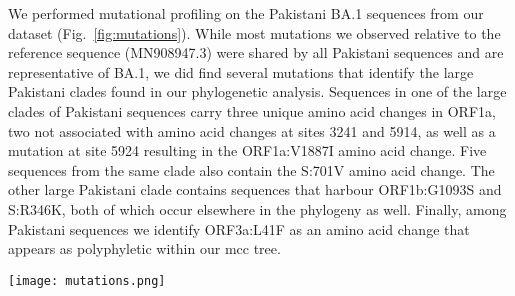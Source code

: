 We performed mutational profiling on the Pakistani BA.1 sequences from our dataset (Fig.~\ref{fig:mutations}).
While most mutations we observed relative to the reference sequence (MN908947.3) were shared by all Pakistani sequences and are representative of BA.1, we did find several mutations that identify the large Pakistani clades found in our phylogenetic analysis.
Sequences in one of the large clades of Pakistani sequences carry three unique amino acid changes in ORF1a, two not associated with amino acid changes at sites 3241 and 5914, as well as a mutation at site 5924 resulting in the ORF1a:V1887I amino acid change.
Five sequences from the same clade also contain the S:701V amino acid change.
The other large Pakistani clade contains sequences that harbour ORF1b:G1093S and S:R346K, both of which occur elsewhere in the phylogeny as well.
Finally, among Pakistani sequences we identify ORF3a:L41F as an amino acid change that appears as polyphyletic within our \gls{mcc} tree.

\begin{sidewaysfigure*}[!hpt]
    \centering
    \texttt{[image: mutations.png]}
    \caption[Key mutations in Pakistan BA.1 dataset]{Condensed amino alignment of SARS-CoV-2 BA.1 sequences from Pakistan (including sequences from this study, and those available online) showing sites that differ from the reference sequence (MN908947.3), and are shared by at least two sequences from Pakistan. The tree on the left is based on the MCC tree but is reduced down to just the BA.1 sequences from Pakistan while preserving their relative phylogenetic positions.}
    \label{fig:mutations}
\end{sidewaysfigure*}

